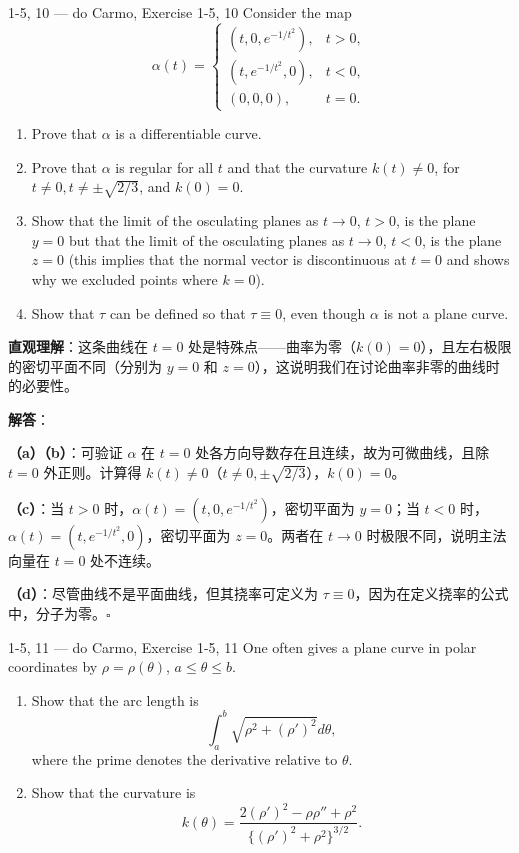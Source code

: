 \begin{exercise}{1-5, 10 — do Carmo, Exercise 1-5, 10}
Consider the map
\[
\alpha(t) = \begin{cases}
(t, 0, e^{-1/t^2}), & t > 0, \\
(t, e^{-1/t^2}, 0), & t < 0, \\
(0, 0, 0), & t = 0.
\end{cases}
\]
\begin{enumerate}
\item[a.] Prove that $\alpha$ is a differentiable curve.
\item[b.] Prove that $\alpha$ is regular for all $t$ and that the curvature $k(t) \neq 0$, for $t \neq 0, t \neq \pm\sqrt{2/3}$, and $k(0) = 0$.
\item[c.] Show that the limit of the osculating planes as $t \to 0$, $t > 0$, is the plane $y = 0$ but that the limit of the osculating planes as $t \to 0$, $t < 0$, is the plane $z = 0$ (this implies that the normal vector is discontinuous at $t = 0$ and shows why we excluded points where $k = 0$).
\item[d.] Show that $\tau$ can be defined so that $\tau \equiv 0$, even though $\alpha$ is not a plane curve.
\end{enumerate}
\end{exercise}

\begin{solution}
\textbf{直观理解}：这条曲线在 $t=0$ 处是特殊点——曲率为零（$k(0)=0$），且左右极限的密切平面不同（分别为 $y=0$ 和 $z=0$），这说明我们在讨论曲率非零的曲线时的必要性。

\textbf{解答}：

\textbf{（a）（b）}：可验证 $\alpha$ 在 $t=0$ 处各方向导数存在且连续，故为可微曲线，且除 $t=0$ 外正则。计算得 $k(t) \neq 0$（$t \neq 0, \pm\sqrt{2/3}$），$k(0) = 0$。

\textbf{（c）}：当 $t>0$ 时，$\alpha(t) = (t,0,e^{-1/t^2})$，密切平面为 $y=0$；当 $t<0$ 时，$\alpha(t) = (t,e^{-1/t^2},0)$，密切平面为 $z=0$。两者在 $t\to 0$ 时极限不同，说明主法向量在 $t=0$ 处不连续。

\textbf{（d）}：尽管曲线不是平面曲线，但其挠率可定义为 $\tau \equiv 0$，因为在定义挠率的公式中，分子为零。$\square$
\end{solution}

\begin{exercise}{1-5, 11 — do Carmo, Exercise 1-5, 11}
One often gives a plane curve in polar coordinates by $\rho = \rho(\theta)$, $a \leq \theta \leq b$.
\begin{enumerate}
\item[a.] Show that the arc length is
\[
\int_a^b \sqrt{\rho^2 + (\rho')^2} d\theta,
\]
where the prime denotes the derivative relative to $\theta$.
\item[b.] Show that the curvature is
\[
k(\theta) = \frac{2(\rho')^2 - \rho\rho'' + \rho^2}{\{(\rho')^2 + \rho^2\}^{3/2}}.
\]
\end{enumerate}
\end{exercise}

